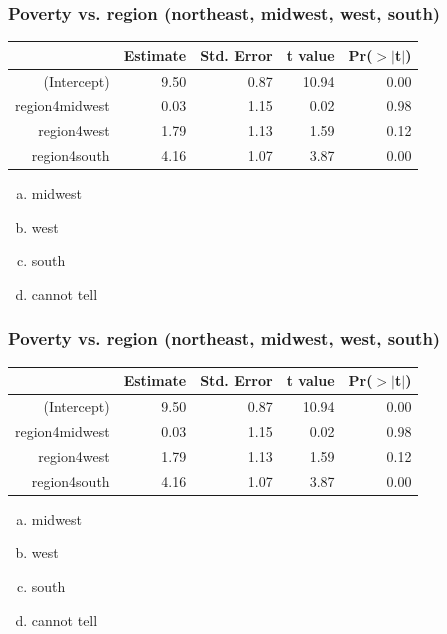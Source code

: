 
\begin{frame}
\frametitle{Poverty vs. region (northeast, midwest, west, south)}


{\small
\begin{center}
\begin{tabular}{rrrrr}
  \hline
 & Estimate & Std. Error & t value & Pr($>$$|$t$|$) \\ 
  \hline
(Intercept) & 9.50 & 0.87 & 10.94 & 0.00 \\ 
region4midwest & 0.03 & 1.15 & 0.02 & 0.98 \\ 
region4west & 1.79 & 1.13 & 1.59 & 0.12 \\ 
region4south & 4.16 & 1.07 & 3.87 & 0.00 \\ 
   \hline
\end{tabular}
\end{center}
}

\begin{enumerate}[(a)]
\item midwest
\item west
\item south
\item cannot tell
\end{enumerate}

\end{frame}


\begin{frame}
\frametitle{Poverty vs. region (northeast, midwest, west, south)}


{\small
\begin{center}
\begin{tabular}{rrrrr}
  \hline
 & Estimate & Std. Error & t value & Pr($>$$|$t$|$) \\ 
  \hline
(Intercept) & 9.50 & 0.87 & 10.94 & 0.00 \\ 
region4midwest & 0.03 & 1.15 & 0.02 & 0.98 \\ 
region4west & 1.79 & 1.13 & 1.59 & 0.12 \\ 
region4south & 4.16 & 1.07 & 3.87 & 0.00 \\ 
   \hline
\end{tabular}
\end{center}
}

\begin{enumerate}[(a)]
\item midwest
\item west
\item south
\item cannot tell
\end{enumerate}

\end{frame}

